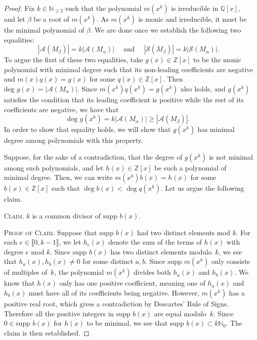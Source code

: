 \documentclass[11pt]{amsart}
\theoremstyle{definition}
\theoremstyle{remark}
\numberwithin{equation}{section}
\newcommand{\nn}{\mathbb{N}}
\newcommand{\qq}{\mathbb{Q}}
\providecommand\ldb{\llbracket}
\providecommand\rdb{\rrbracket}
\begin{document}
\begin{proof}
    Fix $k \in \nn_{\ge 2}$ such that the polynomial $m(x^k)$ is irreducible in $\qq[x]$, and let $\beta$ be a root of $m(x^k)$. As $m(x^k)$ is monic and irreducible, it must be the minimal polynomial of $\beta$. We are done once we establish the following two equalities:
    \[
        |\mathcal{A}(M_\beta)| = k |\mathcal{A}(M_\alpha)| \quad \text{ and } \quad |\mathcal{S}(M_\beta)| = k |\mathcal{S}(M_\alpha)|.
    \]
    To argue the first of these two equalities, take $g(x) \in \mathbb{Z}[x]$ to be the monic polynomial with minimal degree such that its non-leading coefficients are negative and $m(x)q(x)=g(x)$ for some $q(x) \in \mathbb{Z}[x]$. Then $\text{deg } g(x) = |\mathcal{A}(M_\alpha)|$. Since $m(x^k)q(x^k)=g(x^k)$ also holds, and $g(x^k)$ satisfies the condition that its leading coefficient is positive while the rest of its coefficients are negative, we have that
    \[
        \text{deg } g(x^k) = k |\mathcal{A}(M_\alpha)| \geq |\mathcal{A}(M_\beta)|.
    \]
    In order to show that equality holds, we will show that $g(x^k)$ has minimal degree among polynomials with this property.
   
    Suppose, for the sake of a contradiction, that the degree of $g(x^k)$ is not minimal among such polynomials, and let $h(x)\in\mathbb{Z}[x]$ be such a polynomial of minimal degree. Then, we can write $m(x^k)b(x) = h(x)$ for some $b(x) \in \mathbb{Z}[x]$ such that $\deg b(x) < \deg q(x^k)$. Let us argue the following claim.
    \smallskip

    \noindent \textsc{Claim.} $k$ is a common divisor of $\text{supp } b(x)$.
    \smallskip

    \noindent \textsc{Proof of Claim.} Suppose that $\text{supp } b(x)$ had two distinct elements mod $k$. For each $e \in \ldb 0,k-1 \rdb$, we let $h_e(x)$ denote the sum of the terms of $h(x)$ with degree $e$ mod $k$. Since $\text{supp } b(x)$ has two distinct elements modulo~$k$, we see that $h_a(x),h_b(x) \neq 0$ for some distinct $a,b$. Since $\text{supp } m(x^k)$ only consists of multiples of~$k$, the polynomial $m(x^k)$ divides both $h_a(x)$ and $h_b(x)$. We know that $h(x)$ only has one positive coefficient, meaning one of $h_a(x)$ and $h_b(x)$ must have all of its coefficients being negative. However, $m(x^k)$ has a positive real root, which gives a contradiction by Descartes' Rule of Signs. Therefore all the positive integers in $\text{supp } b(x)$ are equal modulo~$k$. Since $0 \in \text{supp } b(x)$ for $h(x)$ to be minimal, we see that $\text{supp } b(x) \subset k\nn_0$. The claim is then established.
    \smallskip


\end{proof}
\end{document}
